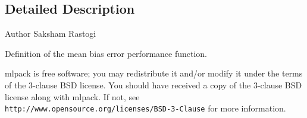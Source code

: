 \subsection{Detailed Description}
\begin{DoxyAuthor}{Author}
Saksham Rastogi
\end{DoxyAuthor}
Definition of the mean bias error performance function.

mlpack is free software; you may redistribute it and/or modify it under the terms of the 3-\/clause B\+SD license. You should have received a copy of the 3-\/clause B\+SD license along with mlpack. If not, see {\tt http\+://www.\+opensource.\+org/licenses/\+B\+S\+D-\/3-\/\+Clause} for more information. 